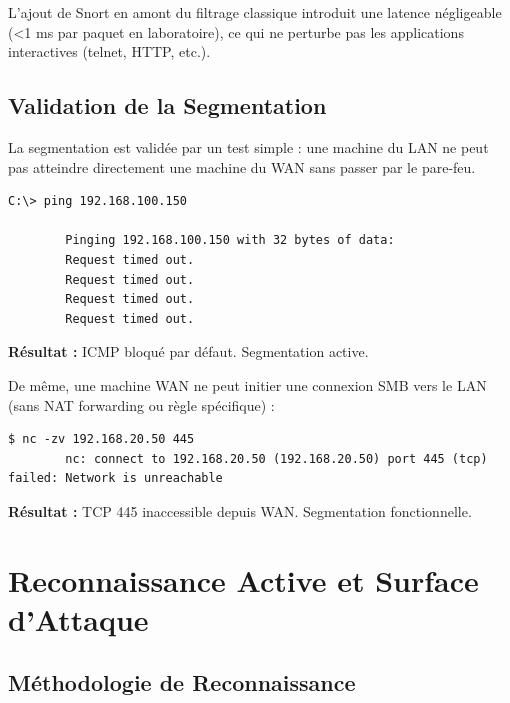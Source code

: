 \documentclass[12pt,a4paper,openany]{report}
\begin{document}
L'ajout de Snort en amont du filtrage classique introduit une latence négligeable (\textless 1 ms par paquet en laboratoire), ce qui ne perturbe pas les applications interactives (telnet, HTTP, etc.).

\section{Validation de la Segmentation}

La segmentation est validée par un test simple : une machine du LAN ne peut pas atteindre directement une machine du WAN sans passer par le pare-feu.

\begin{lstlisting}[caption=Test de segmentation : LAN $\not\rightarrow$ WAN direct]
		C:\> ping 192.168.100.150
		
		Pinging 192.168.100.150 with 32 bytes of data:
		Request timed out.
		Request timed out.
		Request timed out.
		Request timed out.
	\end{lstlisting}

\textcolor{success}{\checkmark} \textbf{Résultat :} ICMP bloqué par défaut. Segmentation active.

De même, une machine WAN ne peut initier une connexion SMB vers le LAN (sans NAT forwarding ou règle spécifique) :

\begin{lstlisting}[caption=Test de segmentation : WAN $\not\rightarrow$ LAN (port 445)]
		$ nc -zv 192.168.20.50 445
		nc: connect to 192.168.20.50 (192.168.20.50) port 445 (tcp) failed: Network is unreachable
	\end{lstlisting}

\textcolor{success}{\checkmark} \textbf{Résultat :} TCP 445 inaccessible depuis WAN. Segmentation fonctionnelle.

\chapter{Reconnaissance Active et Surface d'Attaque}

\section{Méthodologie de Reconnaissance}
\end{document}
